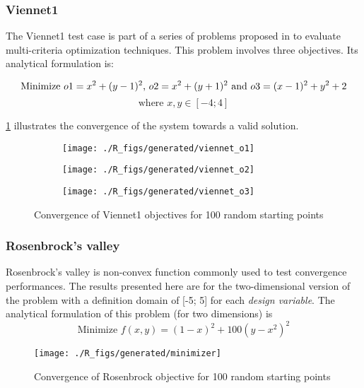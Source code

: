 \subsubsection{Viennet1}

The Viennet1 test case is part of a series of problems proposed in \cite{viennet1996multicriteria} to evaluate multi-criteria optimization techniques. This problem involves three objectives. Its analytical formulation is:


$$\text{Minimize } o1 = x^2 + (y-1)^2 \text{, } o2 = x^2 + (y+1)^2 \text{ and } o3 = (x-1)^2 + y^2 +2\\$$
$$\text{where } x, y \in  [-4;4]
$$

\figurename \ref{viennet_res} illustrates the convergence of the system towards a valid solution.


\begin{figure}[h]

	\begin{subfigure}[b]{0.32\textwidth}
		\centering
		\texttt{[image: ./R\_figs/generated/viennet\_o1]}	
	\end{subfigure}
	\hfill%
	\begin{subfigure}[b]{0.32\textwidth}
		\centering
		\texttt{[image: ./R\_figs/generated/viennet\_o2]}	
	\end{subfigure}
	\hfill%
	\begin{subfigure}[b]{0.32\textwidth}
		\centering
		\texttt{[image: ./R\_figs/generated/viennet\_o3]}	
	\end{subfigure}
	\caption{Convergence of Viennet1 objectives for 100 random starting points}
	\label{viennet_res}
\end{figure}

\subsubsection{Rosenbrock's valley}

Rosenbrock's valley is non-convex function commonly used to test convergence performances. The results presented here are for the two-dimensional version of the problem with a definition domain of [-5; 5] for each \emph{design variable}.
The analytical formulation of this problem (for two dimensions) is 
$$\text{Minimize } f(x,y) = (1-x)^2 + 100(y - x^2)^2$$

\begin{wrapfigure}{R}{0.5\textwidth}
    \texttt{[image: ./R\_figs/generated/minimizer]}	
	\caption{Convergence of Rosenbrock objective for 100 random starting points}
	\vspace{-20pt}
\end{wrapfigure}

